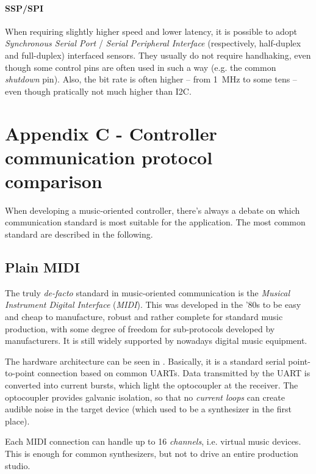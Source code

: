 \documentclass[a4paper,10pt]{article}
\begin{document}
\begin{multicols}{2}
\paragraph{SSP/SPI}
When requiring slightly higher speed and lower latency, it is possible to
adopt \emph{Synchronous Serial Port} / \emph{Serial Peripheral Interface}
(respectively, half-duplex and full-duplex) interfaced sensors.
They usually do not require handhaking, even though some control pins are
often used in such a way (e.g. the common \emph{shutdown} pin).
Also, the bit rate is often higher -- from 1~MHz to some tens -- even though
pratically not much higher than I2C.


\section{Appendix C - Controller communication protocol comparison}

When developing a music-oriented controller, there's always a debate on which
communication standard is most suitable for the application. The most common
standard are described in the following.


\subsection{Plain MIDI}

The truly \emph{de-facto} standard in music-oriented communication is the
\emph{Musical Instrument Digital Interface} (\emph{MIDI}). This was
developed in the '80s to be easy and cheap to manufacture, robust and rather
complete for standard music production, with some degree of freedom for
sub-protocols developed by manufacturers. It is still widely supported by
nowadays digital music equipment.

The hardware architecture can be seen in \CITEME. Basically, it is a standard
serial point-to-point connection based on common UARTs. Data transmitted by
the UART is converted into current bursts, which light the optocoupler at the
receiver. The optocoupler provides galvanic isolation, so that no
\emph{current loops} can create audible noise in the target device (which
used to be a synthesizer in the first place).

Each MIDI connection can handle up to 16 \emph{channels}, i.e. virtual music
devices. This is enough for common synthesizers, but not to drive an entire
production studio.


\end{multicols}
\end{document}
